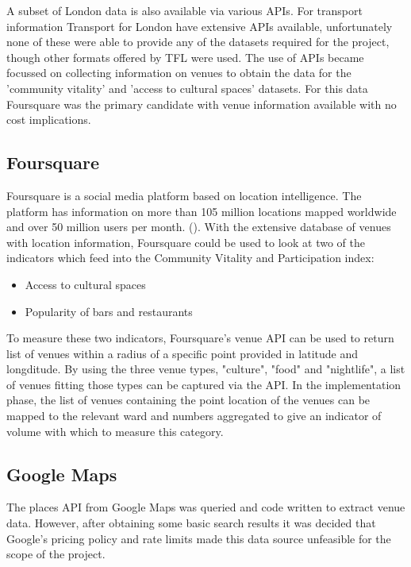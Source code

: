 A subset of London data is also available via various APIs. For transport information Transport for London have extensive APIs available, unfortunately none of these were able to provide any of the datasets required for the project, though other formats offered by TFL were used. The use of APIs became focussed on collecting information on venues to obtain the data for the 'community vitality' and 'access to cultural spaces' datasets. For this data Foursquare was the primary candidate with venue information available with no cost implications. 


\subsection{Foursquare}

Foursquare is a social media platform based on location intelligence. The platform has information on more than 105 million locations mapped worldwide and over 50 million users per month. (\cite{foursquare}). With the extensive database of venues with location information, Foursquare could be used to look at two of the indicators which feed into the Community Vitality and Participation index:
\begin{itemize}
\item Access to cultural spaces
\item Popularity of bars and restaurants
\end{itemize}
To measure these two indicators, Foursquare's venue API can be used to return list of venues within a radius of a specific point provided in latitude and longditude.
By using the three venue types, "culture", "food" and "nightlife", a list of venues fitting those types can be captured via the API. In the implementation phase, the list of venues containing the point location of the venues can be mapped to the relevant ward and numbers aggregated to give an indicator of volume with which to measure this category.



\subsection{Google Maps}
The places API from Google Maps was queried and code written to extract venue data. However, after obtaining some basic search results it was decided that Google's pricing policy and rate limits made this data source unfeasible for the scope of the project.

